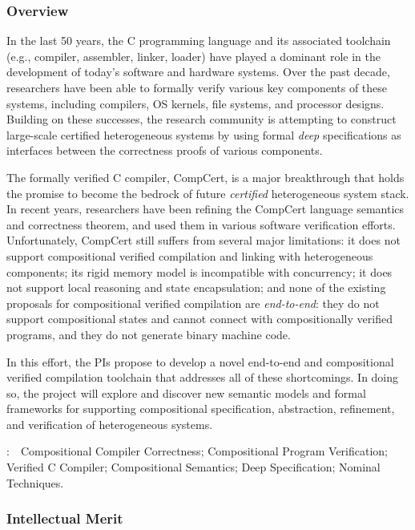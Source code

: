 \subsubsection*{Overview}

In the last 50 years, the C programming language and its associated
toolchain (e.g., compiler, assembler, linker, loader) have played a
dominant role in the development of today's software and hardware
systems.  Over the past decade, researchers have been able to formally
verify various key components of these systems, including compilers,
OS kernels, file systems, and processor designs. Building on these
successes, the research community is attempting to construct
large-scale certified heterogeneous systems by using formal {\em deep}
specifications as interfaces between the correctness proofs of various
components.

The formally verified C compiler, CompCert, is a major breakthrough
that holds the promise to become the bedrock of future {\em certified}
heterogeneous system stack. In recent years, researchers have been
refining the CompCert language semantics and correctness theorem, and
used them in various software verification efforts.  Unfortunately,
CompCert still suffers from several major limitations: it does not
support compositional verified compilation and linking with
heterogeneous components; its rigid memory model is incompatible with
concurrency; it does not support local reasoning and state
encapsulation; and none of the existing proposals for compositional
verified compilation are {\em end-to-end}: they do not support
compositional states and cannot connect with compositionally verified
programs, and they do not generate binary machine code.

In this effort, the PIs propose to develop a novel end-to-end and
compositional verified
compilation toolchain that addresses all of these shortcomings. In
doing so, the project will explore and discover new semantic
models and formal frameworks for supporting compositional
specification, abstraction, refinement, and verification of
heterogeneous systems. 

\vspace{+2mm}
:~~{Compositional Compiler Correctness;
Compositional Program Verification; Verified C Compiler;
Compositional Semantics; Deep Specification; Nominal Techniques.}

\subsubsection*{Intellectual Merit}

